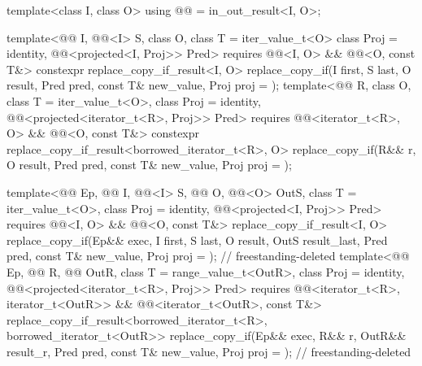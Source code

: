 \begin{codeblock}
{{    template<class I, class O>
      using @@ = in_out_result<I, O>;

    template<@@ I, @@<I> S, class O, class T = iter_value_t<O>
             class Proj = identity, @@<projected<I, Proj>> Pred>
      requires @@<I, O> && @@<O, const T&>
      constexpr replace_copy_if_result<I, O>
        replace_copy_if(I first, S last, O result, Pred pred, const T& new_value,
                        Proj proj = {});
    template<@@ R, class O, class T = iter_value_t<O>, class Proj = identity,
             @@<projected<iterator_t<R>, Proj>> Pred>
      requires @@<iterator_t<R>, O> && @@<O, const T&>
      constexpr replace_copy_if_result<borrowed_iterator_t<R>, O>
        replace_copy_if(R&& r, O result, Pred pred, const T& new_value,
                        Proj proj = {});

    template<@@ Ep, @@ I, @@<I> S,
             @@ O, @@<O> OutS, class T = iter_value_t<O>,
             class Proj = identity, @@<projected<I, Proj>> Pred>
      requires @@<I, O> && @@<O, const T&>
      replace_copy_if_result<I, O>
        replace_copy_if(Ep&& exec, I first, S last, O result, OutS result_last,
                        Pred pred, const T& new_value, Proj proj = {});     // freestanding-deleted
    template<@@ Ep, @@ R, @@ OutR,
             class T = range_value_t<OutR>, class Proj = identity,
             @@<projected<iterator_t<R>, Proj>> Pred>
      requires @@<iterator_t<R>, iterator_t<OutR>> &&
               @@<iterator_t<OutR>, const T&>
      replace_copy_if_result<borrowed_iterator_t<R>, borrowed_iterator_t<OutR>>
        replace_copy_if(Ep&& exec, R&& r, OutR&& result_r, Pred pred, const T& new_value,
                        Proj proj = {});                                    // freestanding-deleted
  }

}
\end{codeblock}
